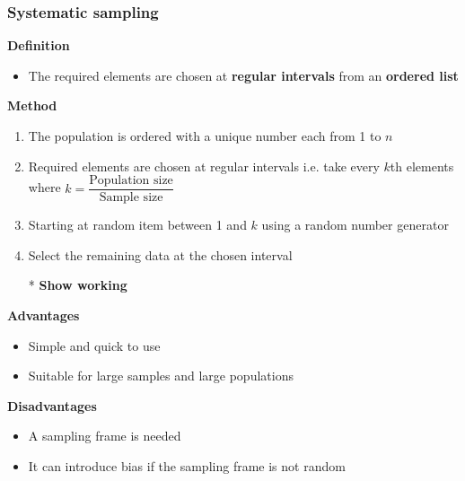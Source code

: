 \documentclass[A4paper, 11pt]{article}
\begin{document}
	\subsubsection{Systematic sampling}
	\textbf{Definition}
	\begin{itemize}
		\item The required elements are chosen at \textbf{regular intervals} from an \textbf{ordered list}
	\end{itemize}
	\textbf{Method}
	\begin{enumerate}
		\item The population is ordered with a unique number each from 1 to $n$
		\item Required elements are chosen at regular intervals i.e. take every $k$th elements where $k=\dfrac{\text{Population size}}{\text{Sample size}}$
		\item Starting at random item between 1 and $k$ using a random number generator
		\item Select the remaining data at the chosen interval
		\item[*] \textbf{Show working}
	\end{enumerate}
	\textbf{Advantages}
	\begin{itemize}
		\item Simple and quick to use
		\item Suitable for large samples and large populations
	\end{itemize}
	\textbf{Disadvantages}
	\begin{itemize}
		\item A sampling frame is needed
		\item It can introduce bias if the sampling frame is not random
	\end{itemize}
\end{document}
